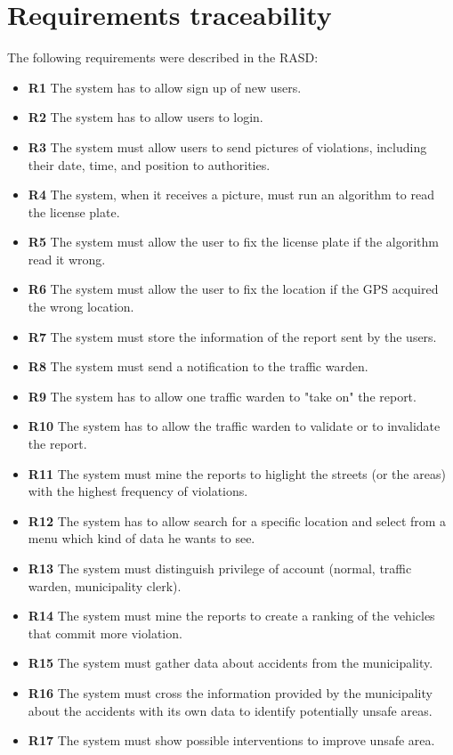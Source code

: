 \documentclass{article}
\begin{document}
\newpage
\section{Requirements traceability}
The following requirements were described in the RASD:
\begin{itemize}
\item	\textbf{R1} The system has to allow sign up of new users.
\item	\textbf{R2} The system has to allow users to login.
\item	\textbf{R3} The system must allow users to send pictures of violations, including their date, time, and position to authorities.
\item	\textbf{R4} The system, when it receives a picture, must run an algorithm to read the license plate.
\item	\textbf{R5} The system must allow the user to fix the license plate if the algorithm read it wrong.
\item	\textbf{R6} The system must allow the user to fix the location if the GPS acquired the wrong location.
\item	\textbf{R7} The system must store the information of the report sent by the users.
\item	\textbf{R8} The system must send a notification to the traffic warden.
\item	\textbf{R9} The system has to allow one traffic warden to "take on" the report.
\item	\textbf{R10} The system has to allow the traffic warden to validate or to invalidate the report.
\item	\textbf{R11} The system must mine the reports to higlight the streets (or the areas) with the highest frequency of violations.
\item	\textbf{R12} The system has to allow search for a specific location and select from a menu which kind of data he wants to see.
\item	\textbf{R13} The system must distinguish privilege of account (normal, traffic warden, municipality clerk).
\item	\textbf{R14} The system must mine the reports to create a ranking of the vehicles that commit more violation.
\item	\textbf{R15} The system must gather data about accidents from the municipality.
\item	\textbf{R16} The system must cross the information provided by the municipality about the accidents with its own data to identify potentially unsafe areas.
\item	\textbf{R17} The system must show possible interventions to improve unsafe area.
\end{itemize}
\end{document}
